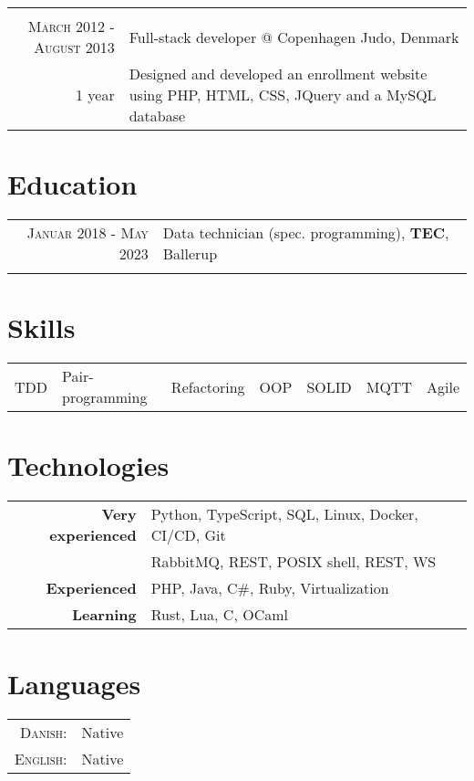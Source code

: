 \documentclass[a4paper,10pt]{article}
\begin{document}
\begin{tabular}{r|p{11cm}}
	\multicolumn{2}{c}{}                                                                       \\
	\textsc{March 2012 - August 2013}      & Full-stack developer @ Copenhagen Judo, Denmark   \\ \footnotesize{1 year}&\footnotesize{Designed and developed an enrollment website using PHP, HTML, CSS, JQuery and a MySQL database}\\
\end{tabular}

\section{Education}
\begin{tabular}{rl}
	\textsc{Januar 2018 - May 2023} & Data technician (spec. programming), \textbf{TEC}, Ballerup \\ & \\
\end{tabular}

\section{Skills}
\begin{tabular}{lllllll}
	TDD & Pair-programming & Refactoring & OOP & SOLID & MQTT & Agile \\
\end{tabular}

\section{Technologies}
\begin{tabular}{rl}
	\textbf{Very experienced} & Python, TypeScript, SQL, Linux, Docker, CI/CD, Git \\
	                          & RabbitMQ, REST, POSIX shell, REST, WS              \\
	\textbf{Experienced}      & PHP, Java, C\#, Ruby, Virtualization               \\
	\textbf{Learning}         & Rust, Lua, C, OCaml
\end{tabular}

\section{Languages}
\begin{tabular}{rl}
	\textsc{Danish:}  & Native \\
	\textsc{English:} & Native \\
\end{tabular}
\end{document}
